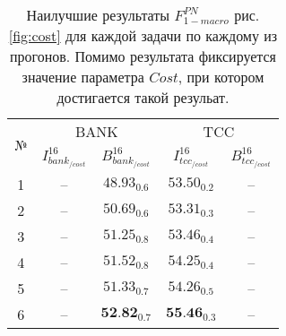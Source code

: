 \begin{table}[htp!]
\centering
\caption{Наилучшие результаты $F_{1-macro}^{PN}$ рис. \ref{fig:cost}
    для каждой задачи по каждому из прогонов.
    Помимо результата фиксируется значение параметра $Cost$, при котором
    достигается такой резульат.
}
\label{table:cost}
\begin{tabular}{ccccc}
\hline
\multicolumn{1}{c|}{\multirow{2}{*}{№}} & \multicolumn{2}{c|}{BANK}                                                   & \multicolumn{2}{c}{TCC}                                           \\ \cline{2-5}
\multicolumn{1}{c|}{}                   & \multicolumn{1}{c|}{$I_{bank_{/cost}}^{16}$} & \multicolumn{1}{c|}{$B_{bank_{/cost}}^{16}$} & \multicolumn{1}{c|}{$I_{tcc_{/cost}}^{16}$}  & $B_{tcc_{/cost}}^{16}$             \\ \hline
1                                       & --                                           &  $48.93_{0.6}$                              & $53.50_{0.2}$                                & --                         \\
2                                       & --                                           &  $50.69_{0.6}$                              & $53.31_{0.3}$                                & --                         \\
3                                       & --                                           &  $51.25_{0.8}$                              & $53.46_{0.4}$                                & --                         \\
4                                       & --                                           &  $51.52_{0.8}$                              & $54.25_{0.4}$                                & --                         \\
5                                       & --                                           &  $51.33_{0.7}$                              & $54.26_{0.5}$                                & --                         \\
6                                       & --                                           &  $\textbf{52.82}_{0.7}$                     & $\textbf{55.46}_{0.3}$                       & --                         \\ \hline
\end{tabular}
\end{table}

